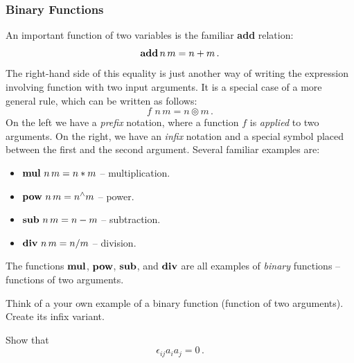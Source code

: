 \subsubsection{Binary Functions}
An important function of two variables is the familiar {\bf add} relation:
\[
\textrm{\bf {add}}\,n\,m = n + m\,.
\]
The right-hand side of this equality is just another way of writing
the expression involving function with two input arguments. It is a
special case of a more general rule, which can be written as follows:
\[
f\,\,n\,m = n\circledcirc m\,.
\]
On the left we have a \emph{prefix} notation, where a function $f$
is \emph{applied} to two arguments. On the right, we have an
\emph{infix} notation and a special symbol placed between the first
and the second argument. Several familiar examples are:
\begin{itemize}
\item $\textrm{\bf {mul}}\,\,n\,m = n * m$ -- multiplication.
\item $\textrm{\bf {pow}}\,\,n\,m = n^\wedge m$ -- power.
\item $\textrm{\bf {sub}}\,\,n\,m = n - m$ -- subtraction.
\item $\textrm{\bf {div}}\,\,n\,m = n / m$ -- division.
\end{itemize}
The functions $\textrm{\bf {mul}}$, $\textrm{\bf {pow}}$, $\textrm{\bf {sub}}$, and $\textrm{\bf {div}}$ are all examples of
\emph{binary} functions -- functions of two arguments.
\begin{exercise}\label{exe:binaryYourOwn}
Think of a your own example of a binary function (function of two
arguments). Create its infix variant.
\end{exercise}


\begin{exercise}\label{exe:ESRSymmetricAntisymmetric}
  Show that
  \[
  \epsilon_{ij}a_ia_j = 0\,.
  \]
\end{exercise}


